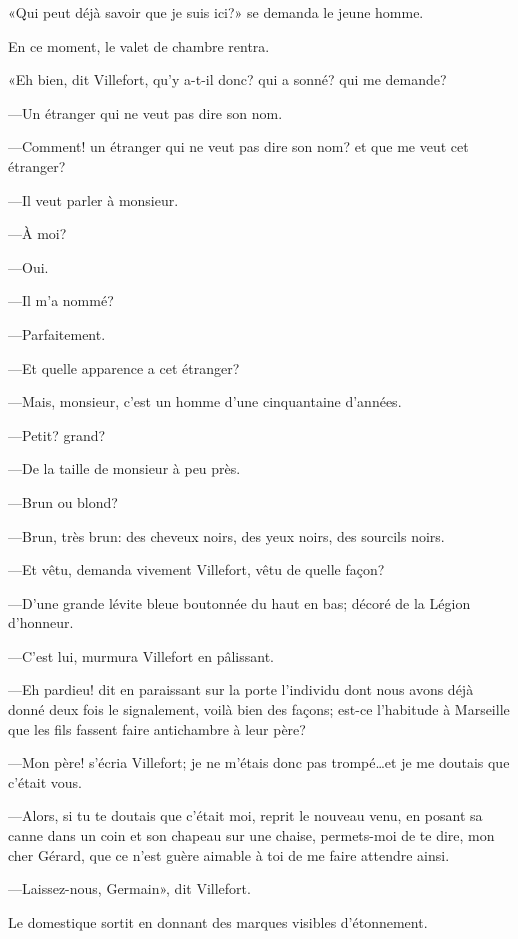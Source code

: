 «Qui peut déjà savoir que je suis ici?» se demanda le jeune homme.

En ce moment, le valet de chambre rentra.

«Eh bien, dit Villefort, qu'y a-t-il donc? qui a sonné? qui me demande?

—Un étranger qui ne veut pas dire son nom.

—Comment! un étranger qui ne veut pas dire son nom? et que me veut cet étranger?

—Il veut parler à monsieur.

—À moi?

—Oui.

—Il m'a nommé?

—Parfaitement.

—Et quelle apparence a cet étranger?

—Mais, monsieur, c'est un homme d'une cinquantaine d'années.

—Petit? grand?

—De la taille de monsieur à peu près.

—Brun ou blond?

—Brun, très brun: des cheveux noirs, des yeux noirs, des sourcils noirs.

—Et vêtu, demanda vivement Villefort, vêtu de quelle façon?

—D'une grande lévite bleue boutonnée du haut en bas; décoré de la Légion d'honneur.

—C'est lui, murmura Villefort en pâlissant.

—Eh pardieu! dit en paraissant sur la porte l'individu dont nous avons déjà donné deux fois le signalement, voilà bien des façons; est-ce l'habitude à Marseille que les fils fassent faire antichambre à leur père?

—Mon père! s'écria Villefort; je ne m'étais donc pas trompé\dots et je me doutais que c'était vous.

—Alors, si tu te doutais que c'était moi, reprit le nouveau venu, en posant sa canne dans un coin et son chapeau sur une chaise, permets-moi de te dire, mon cher Gérard, que ce n'est guère aimable à toi de me faire attendre ainsi.

—Laissez-nous, Germain», dit Villefort.

Le domestique sortit en donnant des marques visibles d'étonnement.



